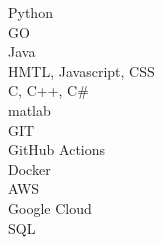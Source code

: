 

 Python\\
 GO\\
 Java\\
 HMTL, Javascript, CSS\\
 C, C++, C\#\\
 matlab\\
 GIT\\
 GitHub Actions\\
 Docker\\
 AWS\\
 Google Cloud\\
 SQL\\
